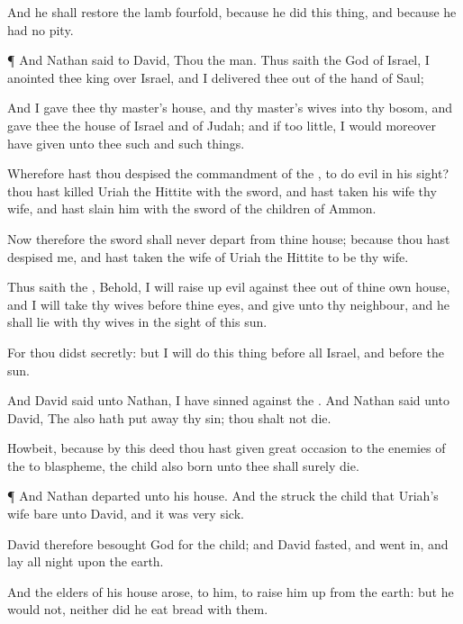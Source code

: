 {And he shall
restore the
lamb
fourfold,
because he
did this
thing, and
because he had no
pity.


\par }{\PP {}¶ And
Nathan
said to
David, Thou
{} the
man. Thus
saith the
{}
God of
Israel, I
anointed thee
king over
Israel, and I
delivered thee out of the
hand of
Saul;

And I
gave thee thy
master’s
house, and thy
master’s
wives into thy
bosom, and
gave thee the
house of
Israel and of
Judah; and if
{} too
little, I would moreover have
given unto thee
such and such
things.

Wherefore hast thou
despised the
commandment of the
{}, to
do
evil in his
sight? thou hast
killed
Uriah the
Hittite with the
sword, and hast
taken his
wife
{} thy
wife, and hast
slain him with the
sword of the
children of
Ammon.

Now therefore the
sword shall
never
depart from thine
house;
because thou hast
despised me, and hast
taken the
wife of
Uriah the
Hittite to be thy
wife.

Thus
saith the
{}, Behold, I will raise
up
evil against thee out of thine own
house, and I will
take thy
wives before thine
eyes, and
give
{} unto thy
neighbour, and he shall
lie with thy
wives in the
sight of this
sun.

For thou
didst
{}
secretly: but I will
do this
thing before all
Israel, and before the
sun.

And
David
said unto
Nathan, I have
sinned against the
{}. And
Nathan
said unto
David, The
{} also hath put
away thy
sin; thou shalt not
die.

Howbeit, because by this
deed thou hast
given great
occasion to the
enemies of the
{} to
blaspheme, the
child also
{}
born unto thee shall
surely
die.


\par }{\PP {}¶ And
Nathan
departed unto his
house. And the
{}
struck the
child that
Uriah’s
wife
bare unto
David, and it was very
sick.

David therefore
besought
God for the
child; and
David
fasted, and went
in, and
lay all
night upon the
earth.

And the
elders of his
house
arose,
{} to him, to raise him
up from the
earth: but he
would not, neither did he
eat
bread with them.

}
